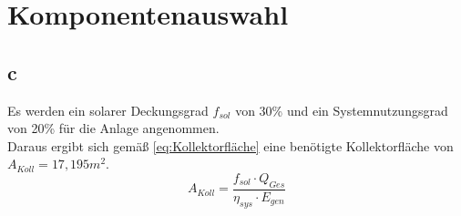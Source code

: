\section{Komponentenauswahl}
\label{sec:Komponentenauswahl}
\subsection{c}
Es werden ein solarer Deckungsgrad $f_{sol}$ von 30\% und ein Systemnutzungsgrad von 20\% für die Anlage angenommen\cite[S.122]{Sick22}.\\
Daraus ergibt sich gemäß \autoref{eq:Kollektorfläche} eine benötigte Kollektorfläche von $A_{Koll}=17,195 m^2$.\\
\begin{equation}
    A_{Koll}= \frac{f_{sol} \cdot Q_{Ges}}{\eta_{sys} \cdot E_{gen}}
    \label{eq:Kollektorfläche}
\end{equation}